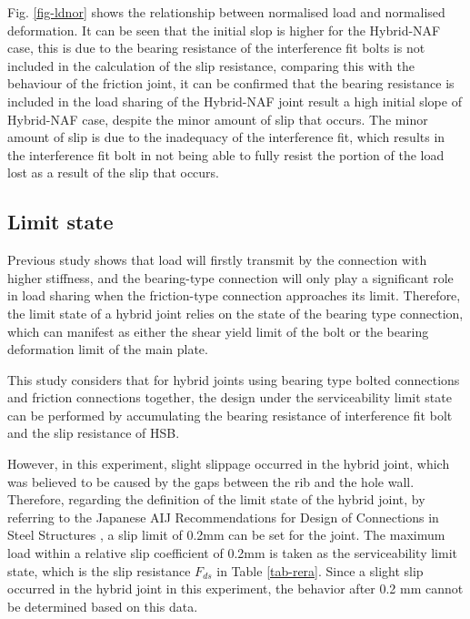 Fig. \ref{fig-ldnor} shows the relationship between normalised load and normalised deformation. It can be seen that the initial slop is higher for the Hybrid-NAF case, this is due to the bearing resistance of the interference fit bolts is not included in the calculation of the slip resistance, comparing this with the behaviour of the friction joint, it can be confirmed that the bearing resistance is included in the load sharing of the Hybrid-NAF joint result a high initial slope of Hybrid-NAF case, despite the minor amount of slip that occurs. The minor amount of slip is due to the inadequacy of the interference fit,  which results in the interference fit bolt in not being able to fully resist the portion of the load lost as a result of the slip that occurs. 


\subsection{Limit state}

Previous study \cite{fisher1965behavior} shows that load will firstly transmit by the connection with higher stiffness, and the bearing-type connection will only play a significant role in load sharing when the friction-type connection approaches its limit. Therefore, the limit state of a hybrid joint relies on the state of the bearing type connection, which can manifest as either the shear yield limit of the bolt or the bearing deformation limit of the main plate.

This study considers that for hybrid joints using bearing type bolted connections and friction connections together, the design under the serviceability limit state can be performed by accumulating the bearing resistance of interference fit bolt and the slip resistance of HSB.

However, in this experiment, slight slippage occurred in the hybrid joint, which was believed to be caused by the gaps between the rib and the hole wall. Therefore, regarding the definition of the limit state of the hybrid joint, by referring to the Japanese AIJ Recommendations for Design of Connections in Steel Structures \cite{2012AIJStructures}, a slip limit of 0.2mm can be set for the joint. The maximum load within a relative slip coefficient of 0.2mm is taken as the serviceability limit state, which is the slip resistance $F_{ds}$ in Table \ref{tab-rera}. Since a slight slip occurred in the hybrid joint in this experiment, the behavior after 0.2 mm cannot be determined based on this data. 

